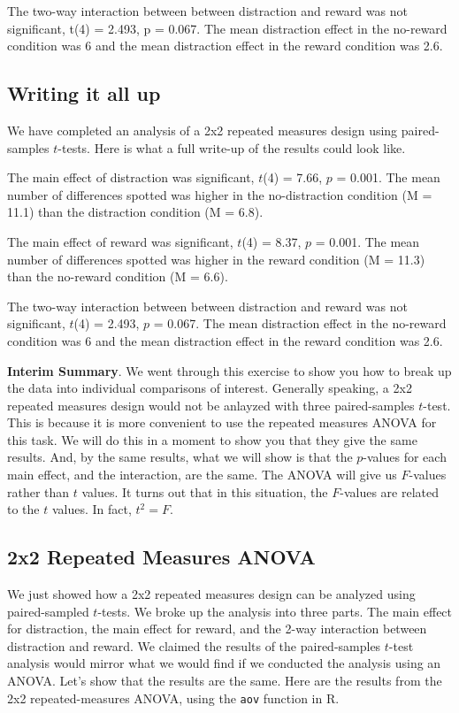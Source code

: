 \documentclass[
]{book}
\begin{document}
The two-way interaction between between distraction and reward was not significant, t(4) = 2.493, p = 0.067. The mean distraction effect in the no-reward condition was 6 and the mean distraction effect in the reward condition was 2.6.

\subsection{Writing it all up}\label{writing-it-all-up}

We have completed an analysis of a 2x2 repeated measures design using paired-samples \(t\)-tests. Here is what a full write-up of the results could look like.

The main effect of distraction was significant, \(t\)(4) = 7.66, \(p\) = 0.001. The mean number of differences spotted was higher in the no-distraction condition (M = 11.1) than the distraction condition (M = 6.8).

The main effect of reward was significant, \(t\)(4) = 8.37, \(p\) = 0.001. The mean number of differences spotted was higher in the reward condition (M = 11.3) than the no-reward condition (M = 6.6).

The two-way interaction between between distraction and reward was not significant, \(t\)(4) = 2.493, \(p\) = 0.067. The mean distraction effect in the no-reward condition was 6 and the mean distraction effect in the reward condition was 2.6.

\textbf{Interim Summary}. We went through this exercise to show you how to break up the data into individual comparisons of interest. Generally speaking, a 2x2 repeated measures design would not be anlayzed with three paired-samples \(t\)-test. This is because it is more convenient to use the repeated measures ANOVA for this task. We will do this in a moment to show you that they give the same results. And, by the same results, what we will show is that the \(p\)-values for each main effect, and the interaction, are the same. The ANOVA will give us \(F\)-values rather than \(t\) values. It turns out that in this situation, the \(F\)-values are related to the \(t\) values. In fact, \(t^2 = F\).

\subsection{2x2 Repeated Measures ANOVA}\label{x2-repeated-measures-anova}

We just showed how a 2x2 repeated measures design can be analyzed using paired-sampled \(t\)-tests. We broke up the analysis into three parts. The main effect for distraction, the main effect for reward, and the 2-way interaction between distraction and reward. We claimed the results of the paired-samples \(t\)-test analysis would mirror what we would find if we conducted the analysis using an ANOVA. Let's show that the results are the same. Here are the results from the 2x2 repeated-measures ANOVA, using the \texttt{aov} function in R.
\end{document}
